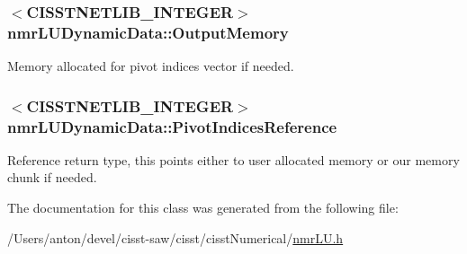 \subsubsection[{Output\+Memory}]{$<$C\+I\+S\+S\+T\+N\+E\+T\+L\+I\+B\+\_\+\+I\+N\+T\+E\+G\+E\+R$>$ nmr\+L\+U\+Dynamic\+Data\+::\+Output\+Memory\hspace{0.3cm}{\ttfamily [protected]}}\label{classnmr_l_u_dynamic_data_acf9e9d0bb436f0e04c6d6138b1cbd8fd}
Memory allocated for pivot indices vector if needed. \hypertarget{classnmr_l_u_dynamic_data_a45c056cf29f16a5e97fafee6484a009e}{}
\subsubsection[{Pivot\+Indices\+Reference}]{$<$C\+I\+S\+S\+T\+N\+E\+T\+L\+I\+B\+\_\+\+I\+N\+T\+E\+G\+E\+R$>$ nmr\+L\+U\+Dynamic\+Data\+::\+Pivot\+Indices\+Reference\hspace{0.3cm}{\ttfamily [protected]}}\label{classnmr_l_u_dynamic_data_a45c056cf29f16a5e97fafee6484a009e}
Reference return type, this points either to user allocated memory or our memory chunk if needed. 

The documentation for this class was generated from the following file\+:\begin{DoxyCompactItemize}
\item 
/\+Users/anton/devel/cisst-\/saw/cisst/cisst\+Numerical/\hyperlink{nmr_l_u_8h}{nmr\+L\+U.\+h}\end{DoxyCompactItemize}
